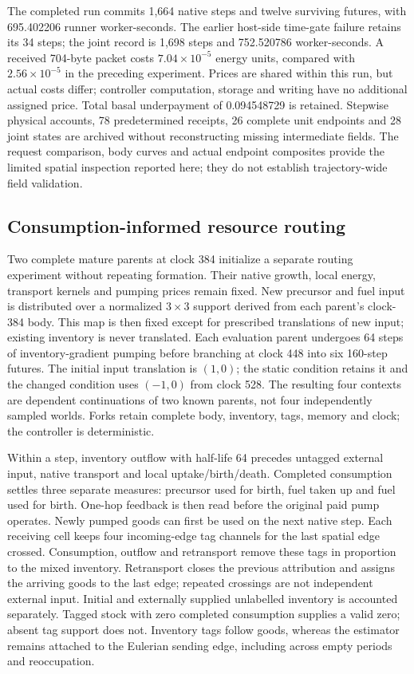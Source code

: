 The completed run commits 1,664 native steps and twelve surviving futures, with 695.402206 runner worker-seconds. The earlier host-side time-gate failure retains its 34 steps; the joint record is 1,698 steps and 752.520786 worker-seconds. A received 704-byte packet costs $7.04\times10^{-5}$ energy units, compared with $2.56\times10^{-5}$ in the preceding experiment. Prices are shared within this run, but actual costs differ; controller computation, storage and writing have no additional assigned price. Total basal underpayment of 0.094548729 is retained. Stepwise physical accounts, 78 predetermined receipts, 26 complete unit endpoints and 28 joint states are archived without reconstructing missing intermediate fields. The request comparison, body curves and actual endpoint composites provide the limited spatial inspection reported here; they do not establish trajectory-wide field validation.

\subsection*{Consumption-informed resource routing}
Two complete mature parents at clock 384 initialize a separate routing experiment without repeating formation. Their native growth, local energy, transport kernels and pumping prices remain fixed. New precursor and fuel input is distributed over a normalized $3\times3$ support derived from each parent's clock-384 body. This map is then fixed except for prescribed translations of new input; existing inventory is never translated. Each evaluation parent undergoes 64 steps of inventory-gradient pumping before branching at clock 448 into six 160-step futures. The initial input translation is $(1,0)$; the static condition retains it and the changed condition uses $(-1,0)$ from clock 528. The resulting four contexts are dependent continuations of two known parents, not four independently sampled worlds. Forks retain complete body, inventory, tags, memory and clock; the controller is deterministic.

Within a step, inventory outflow with half-life 64 precedes untagged external input, native transport and local uptake/birth/death. Completed consumption settles three separate measures: precursor used for birth, fuel taken up and fuel used for birth. One-hop feedback is then read before the original paid pump operates. Newly pumped goods can first be used on the next native step. Each receiving cell keeps four incoming-edge tag channels for the last spatial edge crossed. Consumption, outflow and retransport remove these tags in proportion to the mixed inventory. Retransport closes the previous attribution and assigns the arriving goods to the last edge; repeated crossings are not independent external input. Initial and externally supplied unlabelled inventory is accounted separately. Tagged stock with zero completed consumption supplies a valid zero; absent tag support does not. Inventory tags follow goods, whereas the estimator remains attached to the Eulerian sending edge, including across empty periods and reoccupation.

